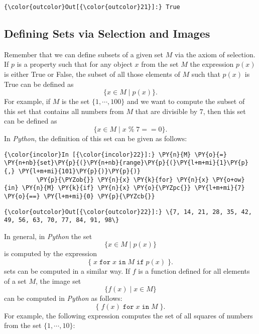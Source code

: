 \begin{Verbatim}[commandchars=\\\{\}]
{\color{outcolor}Out[{\color{outcolor}21}]:} True
\end{Verbatim}
            
\subsection{Defining Sets via Selection and
Images}\label{defining-sets-via-selection-and-images}
Remember that we can define subsets of a given set \(M\) via the axiom of
selection. If \(p\) is a property such that for any object \(x\) from
the set \(M\) the expression \(p(x)\) is either True or False, the
subset of all those elements of \(M\) such that \(p(x)\) is True can be
defined as
 \[ \{ x \in M \mid p(x) \}. \] 
For example, if \(M\) is the
set \(\{1, \cdots, 100\}\) and we want to compute the subset of this set
that contains all numbers from \(M\) that are divisible by \(7\), then
this set can be defined as 
\[ \{ x \in M \mid x \;\texttt{\%}\; 7 == 0 \}. \]
In \textsl{Python}, the definition of this set can be given as follows:

    \begin{Verbatim}[commandchars=\\\{\}]
{\color{incolor}In [{\color{incolor}22}]:} \PY{n}{M} \PY{o}{=} \PY{n+nb}{set}\PY{p}{(}\PY{n+nb}{range}\PY{p}{(}\PY{l+m+mi}{1}\PY{p}{,} \PY{l+m+mi}{101}\PY{p}{)}\PY{p}{)}
         \PY{p}{\PYZob{}} \PY{n}{x} \PY{k}{for} \PY{n}{x} \PY{o+ow}{in} \PY{n}{M} \PY{k}{if} \PY{n}{x} \PY{o}{\PYZpc{}} \PY{l+m+mi}{7} \PY{o}{==} \PY{l+m+mi}{0} \PY{p}{\PYZcb{}}
\end{Verbatim}


\begin{Verbatim}[commandchars=\\\{\}]
{\color{outcolor}Out[{\color{outcolor}22}]:} \{7, 14, 21, 28, 35, 42, 49, 56, 63, 70, 77, 84, 91, 98\}
\end{Verbatim}
In general, in \textsl{Python} the set
 \[ \{ x \in M \mid p(x) \} \] 
is computed by the expression 
\[ \{\; x\; \texttt{for}\; x\; \texttt{in}\; M\; \texttt{if}\; p(x)\; \}. \]
 sets can be computed in a similar way. If \(f\) is a
function defined for all elements of a set \(M\), the image set
\[ \{ f(x) \mid x \in M \} \] can be computed in \textsl{Python} as
follows: \[ \{\; f(x)\; \texttt{for}\; x\; \texttt{in}\; M\; \}. \] For
example, the following expression computes the set of all squares of
numbers from the set \(\{1,\cdots,10\}\):

